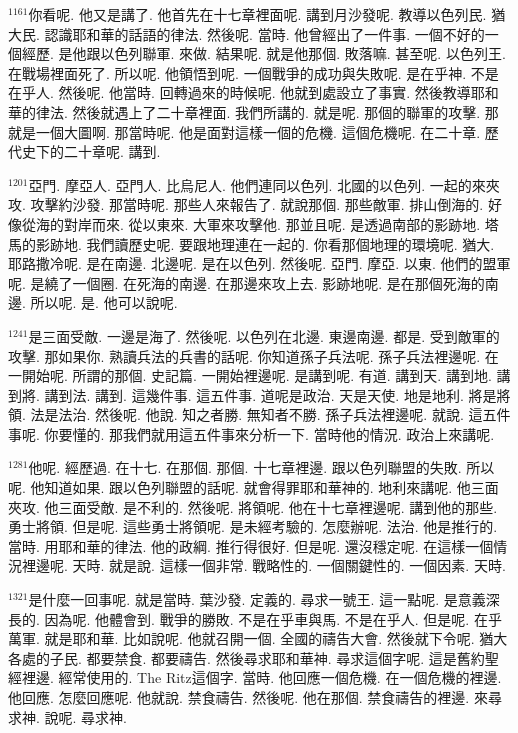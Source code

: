 \documentclass{book}
\begin{document}
$^{1161}$你看呢.
他又是講了.
他首先在十七章裡面呢.
講到月沙發呢.
教導以色列民.
猶大民.
認識耶和華的話語的律法.
然後呢.
當時.
他曾經出了一件事.
一個不好的一個經歷.
是他跟以色列聯軍.
來做.
結果呢.
就是他那個.
敗落嘛.
甚至呢.
以色列王.
在戰場裡面死了.
所以呢.
他領悟到呢.
一個戰爭的成功與失敗呢.
是在乎神.
不是在乎人.
然後呢.
他當時.
回轉過來的時候呢.
他就到處設立了事實.
然後教導耶和華的律法.
然後就遇上了二十章裡面.
我們所講的.
就是呢.
那個的聯軍的攻擊.
那就是一個大圖啊.
那當時呢.
他是面對這樣一個的危機.
這個危機呢.
在二十章.
歷代史下的二十章呢.
講到.

$^{1201}$亞門.
摩亞人.
亞門人.
比烏尼人.
他們連同以色列.
北國的以色列.
一起的來夾攻.
攻擊約沙發.
那當時呢.
那些人來報告了.
就說那個.
那些敵軍.
排山倒海的.
好像從海的對岸而來.
從以東來.
大軍來攻擊他.
那並且呢.
是透過南部的影跡地.
塔馬的影跡地.
我們讀歷史呢.
要跟地理連在一起的.
你看那個地理的環境呢.
猶大.
耶路撒冷呢.
是在南邊.
北邊呢.
是在以色列.
然後呢.
亞門.
摩亞.
以東.
他們的盟軍呢.
是繞了一個圈.
在死海的南邊.
在那邊來攻上去.
影跡地呢.
是在那個死海的南邊.
所以呢.
是.
他可以說呢.

$^{1241}$是三面受敵.
一邊是海了.
然後呢.
以色列在北邊.
東邊南邊.
都是.
受到敵軍的攻擊.
那如果你.
熟讀兵法的兵書的話呢.
你知道孫子兵法呢.
孫子兵法裡邊呢.
在一開始呢.
所謂的那個.
史記篇.
一開始裡邊呢.
是講到呢.
有道.
講到天.
講到地.
講到將.
講到法.
講到.
這幾件事.
這五件事.
道呢是政治.
天是天使.
地是地利.
將是將領.
法是法治.
然後呢.
他說.
知之者勝.
無知者不勝.
孫子兵法裡邊呢.
就說.
這五件事呢.
你要懂的.
那我們就用這五件事來分析一下.
當時他的情況.
政治上來講呢.

$^{1281}$他呢.
經歷過.
在十七.
在那個.
那個.
十七章裡邊.
跟以色列聯盟的失敗.
所以呢.
他知道如果.
跟以色列聯盟的話呢.
就會得罪耶和華神的.
地利來講呢.
他三面夾攻.
他三面受敵.
是不利的.
然後呢.
將領呢.
他在十七章裡邊呢.
講到他的那些.
勇士將領.
但是呢.
這些勇士將領呢.
是未經考驗的.
怎麼辦呢.
法治.
他是推行的.
當時.
用耶和華的律法.
他的政綱.
推行得很好.
但是呢.
還沒穩定呢.
在這樣一個情況裡邊呢.
天時.
就是說.
這樣一個非常.
戰略性的.
一個關鍵性的.
一個因素.
天時.

$^{1321}$是什麼一回事呢.
就是當時.
葉沙發.
定義的.
尋求一號王.
這一點呢.
是意義深長的.
因為呢.
他體會到.
戰爭的勝敗.
不是在乎車與馬.
不是在乎人.
但是呢.
在乎萬軍.
就是耶和華.
比如說呢.
他就召開一個.
全國的禱告大會.
然後就下令呢.
猶大各處的子民.
都要禁食.
都要禱告.
然後尋求耶和華神.
尋求這個字呢.
這是舊約聖經裡邊.
經常使用的.
The Ritz這個字.
當時.
他回應一個危機.
在一個危機的裡邊.
他回應.
怎麼回應呢.
他就說.
禁食禱告.
然後呢.
他在那個.
禁食禱告的裡邊.
來尋求神.
說呢.
尋求神.
\end{document}

